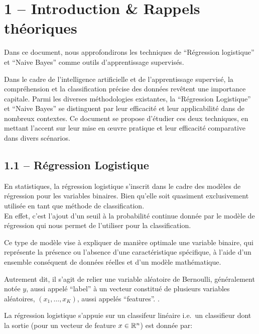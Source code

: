 \documentclass[
]{article}
\author{}
\date{}
\begin{document}
\intro{}

\section{1 -- Introduction \& Rappels
théoriques}\label{introduction-rappels-thuxe9oriques}

Dans ce document, nous approfondirons les techniques de ``Régression
logistique'' et ``Naive Bayes'' comme outils d'apprentissage supervisés.

Dans le cadre de l'intelligence artificielle et de l'apprentissage
supervisé, la compréhension et la classification précise des données
revêtent une importance capitale. Parmi les diverses méthodologies
existantes, la ``Régression Logistique'' et ``Naive Bayes'' se
distinguent par leur efficacité et leur applicabilité dans de nombreux
contextes. Ce document se propose d'étudier ces deux techniques, en
mettant l'accent sur leur mise en œuvre pratique et leur efficacité
comparative dans divers scénarios.

\subsection{1.1 -- Régression
Logistique}\label{ruxe9gression-logistique}

En statistiques, la régression logistique s'inscrit dans le cadre des
modèles de régression pour les variables binaires. Bien qu'elle soit
quasiment exclusivement utilisée en tant que méthode de
classification.\\
En effet, c'est l'ajout d'un seuil à la probabilité continue donnée par
le modèle de régression qui nous permet de l'utiliser pour la
classification.

Ce type de modèle vise à expliquer de manière optimale une variable
binaire, qui représente la présence ou l'absence d'une caractéristique
spécifique, à l'aide d'un ensemble conséquent de données réelles et d'un
modèle mathématique.

Autrement dit, il s'agit de relier une variable aléatoire de Bernoulli,
généralement notée \(y\), aussi appelé ``label'' à un vecteur constitué
de plusieurs variables aléatoires, \((x_1, \ldots, x_K)\), aussi appelés
``features''. \cite{RegressionLogistique2023}.

La régression logistique s'appuie sur un classifeur linéaire
\cite{ClassifieurLineaire2022} i.e.~un classifieur dont la sortie (pour
un vecteur de feature \(x \in \mathbb{R}^n\)) est donnée par:
\end{document}
